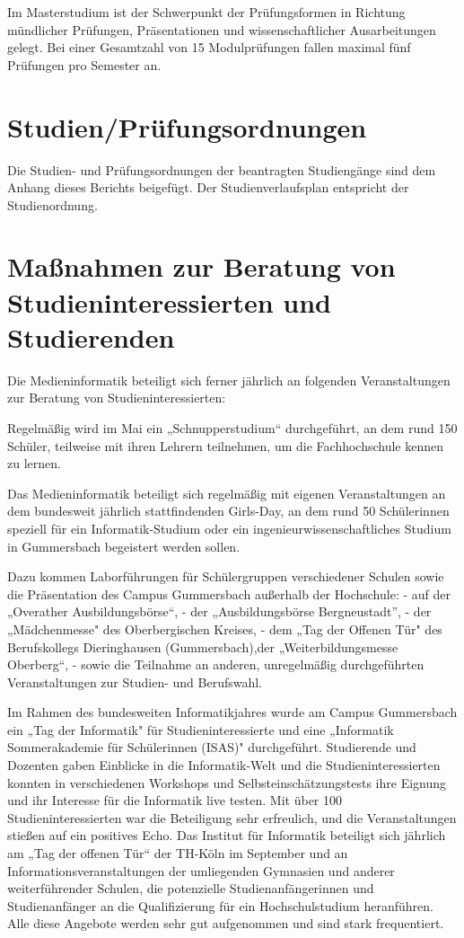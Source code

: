 Im Masterstudium ist der Schwerpunkt der Prüfungsformen in Richtung
mündlicher Prüfungen, Präsentationen und wissenschaftlicher
Ausarbeitungen gelegt. Bei einer Gesamtzahl von 15 Modulprüfungen fallen
maximal fünf Prüfungen pro Semester an.

\section{Studien/Prüfungsordnungen}\label{studienpruxfcfungsordnungen}

Die Studien- und Prüfungsordnungen der beantragten Studiengänge sind dem
Anhang dieses Berichts beigefügt. Der Studienverlaufsplan entspricht der
Studienordnung.

\section{Maßnahmen zur Beratung von Studieninteressierten und
Studierenden}\label{mauxdfnahmen-zur-beratung-von-studieninteressierten-und-studierenden}

Die Medieninformatik beteiligt sich ferner jährlich an folgenden
Veranstaltungen zur Beratung von Studieninteressierten:

Regelmäßig wird im Mai ein „Schnupperstudium`` durchgeführt, an dem rund
150 Schüler, teilweise mit ihren Lehrern teilnehmen, um die
Fachhochschule kennen zu lernen.

Das Medieninformatik beteiligt sich regelmäßig mit eigenen
Veranstaltungen an dem bundesweit jährlich stattfindenden Girls-Day, an
dem rund 50 Schülerinnen speziell für ein Informatik-Studium oder ein
ingenieurwissenschaftliches Studium in Gummersbach begeistert werden
sollen.

Dazu kommen Laborführungen für Schülergruppen verschiedener Schulen
sowie die Präsentation des Campus Gummersbach außerhalb der Hochschule:
- auf der „Overather Ausbildungsbörse``, - der „Ausbildungsbörse
Bergneustadt'', - der „Mädchenmesse" des Oberbergischen Kreises, - dem
„Tag der Offenen Tür" des Berufskollegs Dieringhausen (Gummersbach),der
„Weiterbildungsmesse Oberberg``, - sowie die Teilnahme an anderen,
unregelmäßig durchgeführten Veranstaltungen zur Studien- und Berufswahl.

Im Rahmen des bundesweiten Informatikjahres wurde am Campus Gummersbach
ein „Tag der Informatik" für Studieninteressierte und eine „Informatik
Sommerakademie für Schülerinnen (ISAS)" durchgeführt. Studierende und
Dozenten gaben Einblicke in die Informatik-Welt und die
Studieninteressierten konnten in verschiedenen Workshops und
Selbsteinschätzungstests ihre Eignung und ihr Interesse für die
Informatik live testen. Mit über 100 Studieninteressierten war die
Beteiligung sehr erfreulich, und die Veranstaltungen stießen auf ein
positives Echo. Das Institut für Informatik beteiligt sich jährlich am
„Tag der offenen Tür`` der TH-Köln im September und an
Informationsveranstaltungen der umliegenden Gymnasien und anderer
weiterführender Schulen, die potenzielle Studienanfängerinnen und
Studienanfänger an die Qualifizierung für ein Hochschulstudium
heranführen. Alle diese Angebote werden sehr gut aufgenommen und sind
stark frequentiert.


